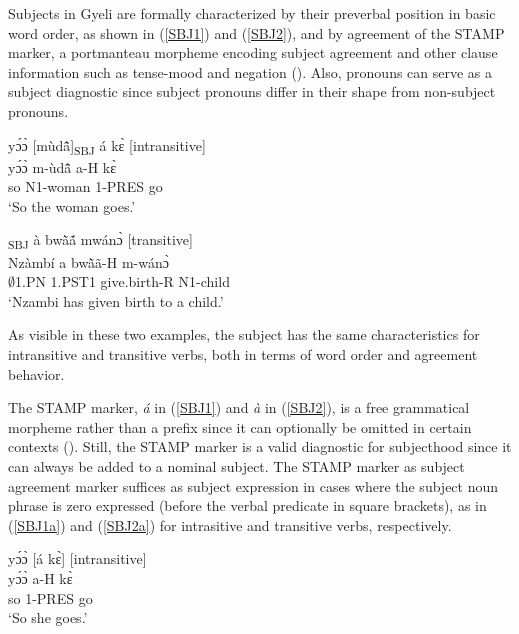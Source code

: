 Subjects in Gyeli are formally characterized by their preverbal position in basic word order, as shown in (\ref{SBJ1}) and (\ref{SBJ2}), and by agreement of the STAMP marker, a portmanteau morpheme encoding subject agreement and other clause information such as tense-mood and negation (). Also, pronouns can serve as a subject diagnostic since subject pronouns differ in their shape from non-subject pronouns.

\begin{exe} 
\ex\label{SBJ1}
  \glll yɔ́ɔ̀ [mùdã̂]\textsubscript{SBJ} á kɛ̀ \hfill [intransitive] \\
        yɔ́ɔ̀ m-ùdã̂ a-H kɛ̀ \\
      so N1-woman 1-PRES go \\
    \trans `So the woman goes.'
\end{exe}

\begin{exe} 
\ex\label{SBJ2}
  \textsubscript{SBJ} à bwã̀ã́ mwánɔ̀ \hfill [transitive] \\
          Nzàmbí a bwã̀ã-H m-wánɔ̀ \\
             $\emptyset$1.PN 1.PST1 give.birth-R N1-child \\
    \trans `Nzambi has given birth to a child.'
\end{exe}

\noindent As visible in these two examples, the subject has the same characteristics for intransitive and transitive verbs, both in terms of word order and agreement behavior. 

The STAMP marker, {\itshape á} in (\ref{SBJ1}) and {\itshape à} in (\ref{SBJ2}), is a free grammatical morpheme rather than a prefix since it can optionally be omitted in certain contexts ().
Still, the STAMP marker is a valid diagnostic for subjecthood since it can always be added to a nominal subject. The STAMP marker as subject agreement marker suffices as subject expression in cases where the subject noun phrase is zero expressed (before the verbal predicate in square brackets), as in (\ref{SBJ1a}) and (\ref{SBJ2a}) for intrasitive and transitive verbs, respectively. 

\begin{exe} 
\ex\label{SBJ1a}
  \glll yɔ́ɔ̀ [á kɛ̀] \hfill [intransitive] \\
        yɔ́ɔ̀ a-H kɛ̀ \\
      so 1-PRES go \\
    \trans `So she goes.'
\end{exe}

